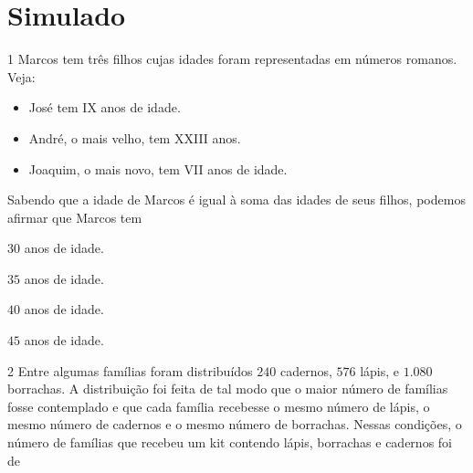 
\chapter[Simulado 2]{Simulado}

\num{1}  Marcos tem três filhos cujas idades foram representadas em números
romanos. Veja:

\begin{itemize}
\item
  José tem IX anos de idade.
\item
  André, o mais velho, tem XXIII anos.
\item
  Joaquim, o mais novo, tem VII anos de idade.
\end{itemize}

Sabendo que a idade de Marcos é igual à soma das idades de seus
filhos, podemos afirmar que Marcos tem

\begin{escolha}
\item $30$ anos de idade.
\item $35$ anos de idade.
\item $40$ anos de idade.
\item $45$ anos de idade.
\end{escolha}



\num{2}  Entre algumas famílias foram distribuídos $240$ cadernos, $576$ lápis, e
$1.080$ borrachas. A distribuição foi feita de tal modo que o maior número
de famílias fosse contemplado e que cada família recebesse o mesmo
número de lápis, o mesmo número de cadernos e o mesmo número de
borrachas. Nessas condições, o número de famílias que recebeu um kit
contendo lápis, borrachas e cadernos foi de

